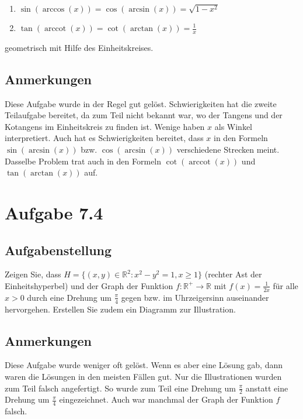 \documentclass[a4paper]{article}
\newcommand*{\R}{\mathbb R}
\begin{document}
\begin{enumerate}
  \item $\sin(\operatorname{arccos}(x)) = \cos(\operatorname{arcsin}(x)) = \sqrt{1-x^2}$
  \item $\tan(\operatorname{arccot}(x)) = \cot(\operatorname{arctan}(x)) = \frac 1x$
\end{enumerate}

geometrisch mit Hilfe des Einheitskreises.

\subsection{Anmerkungen}

Diese Aufgabe wurde in der Regel gut gelöst. Schwierigkeiten hat die zweite Teilaufgabe bereitet, da zum Teil nicht bekannt war, wo der Tangens und der Kotangens im Einheitskreis zu finden ist. Wenige haben $x$ als Winkel interpretiert. Auch hat es Schwierigkeiten bereitet, dass $x$ in den Formeln $\sin(\operatorname{arcsin}(x))$ bzw. $\cos(\operatorname{arcsin}(x))$ verschiedene Strecken meint. Dasselbe Problem trat auch in den Formeln $\cot(\operatorname{arccot}(x))$ und $\tan(\operatorname{arctan}(x))$ auf.

\section{Aufgabe 7.4}

\subsection{Aufgabenstellung}

Zeigen Sie, dass $H=\{(x,y)\in\R^2: x^2-y^2=1,x\ge 1\}$ (rechter Ast der Einheitshyperbel) und der Graph der Funktion $f:\R^{+}\to\R$ mit $f(x)=\frac{1}{2x}$ für alle $x>0$ durch eine Drehung um $\frac \pi4$ gegen bzw. im Uhrzeigersinn auseinander hervorgehen. Erstellen Sie zudem ein Diagramm zur Illustration.

\subsection{Anmerkungen}

Diese Aufgabe wurde weniger oft gelöst. Wenn es aber eine Lösung gab, dann waren die Lösungen in den meisten Fällen gut. Nur die Illustrationen wurden zum Teil falsch angefertigt. So wurde zum Teil eine Drehung um $\tfrac \pi2$ anstatt eine Drehung um $\tfrac \pi4$ eingezeichnet. Auch war manchmal der Graph der Funktion $f$ falsch.
\end{document}
